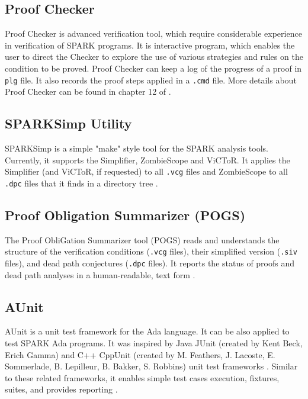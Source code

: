 \subsection{Proof Checker}
\label{background:sparkverification:proofchecker}

Proof Checker is advanced verification tool, which require considerable experience in verification of SPARK programs. It is interactive program, which enables the user to direct the Checker to explore the use of various strategies and rules on the condition to be proved. Proof Checker can keep a log of the progress of a proof in \lstinline{plg} file. It also records the proof steps applied in a \lstinline{.cmd} file. More details about Proof Checker can be found in chapter 12 of \cite{Barnes:Book}.



\subsection{SPARKSimp Utility}
\label{background:sparkverification:sparksimp}
SPARKSimp is a simple "make" style tool for the SPARK analysis tools. Currently, it supports the Simplifier, ZombieScope and ViCToR. It applies the Simplifier (and ViCToR, if requested) to all \lstinline{.vcg} files and ZombieScope to all \lstinline{.dpc} files that it finds in a directory tree \cite{SPARKSimp:Online}.



\subsection{Proof Obligation Summarizer (POGS)}
\label{background:sparkverification:pogs}

The Proof ObliGation Summarizer tool (POGS) reads and understands the structure of the verification conditions (\lstinline{.vcg} files), their simplified version (\lstinline{.siv} files), and dead path conjectures (\lstinline{.dpc} files). It reports the status of proofs and dead path analyses in a human-readable, text form \cite{POGS:Online}.



\subsection{AUnit}
\label{background:sparkverification:aunit}

AUnit is a unit test framework for the Ada language. It can be also applied to test SPARK Ada programs. It was inspired by Java JUnit (created by Kent Beck, Erich Gamma) and C++ CppUnit (created by M. Feathers, J. Lacoste, E. Sommerlade, B. Lepilleur, B. Bakker, S. Robbins) unit test frameworks \cite{AUnitCookbook:Online}. Similar to these related frameworks, it enables simple test cases execution, fixtures, suites, and provides reporting \cite{AUnitTutorials:Online}. 

